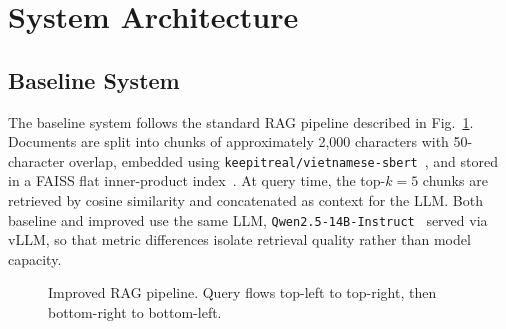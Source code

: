 \documentclass[conference]{IEEEtran}
\begin{document}
\section{System Architecture}

\subsection{Baseline System}

The baseline system follows the standard RAG pipeline described in
Fig.~\ref{fig:pipeline}. Documents are split into chunks of approximately
2,000 characters with 50-character overlap, embedded using
\texttt{keepitreal/vietnamese-sbert}~\cite{reimers2019sentence}, and stored
in a FAISS flat inner-product index~\cite{johnson2019billion}. At query time,
the top-$k=5$ chunks are retrieved by cosine similarity and concatenated as
context for the LLM. Both baseline and improved use the same LLM,
\texttt{Qwen2.5-14B-Instruct}~\cite{qwen25} served via vLLM, so that metric
differences isolate retrieval quality rather than model capacity.

\begin{figure}[h]
\centering
{}
\caption{Improved RAG pipeline. Query flows top-left to top-right, then bottom-right to bottom-left.}
\label{fig:pipeline}
\end{figure}
\end{document}
